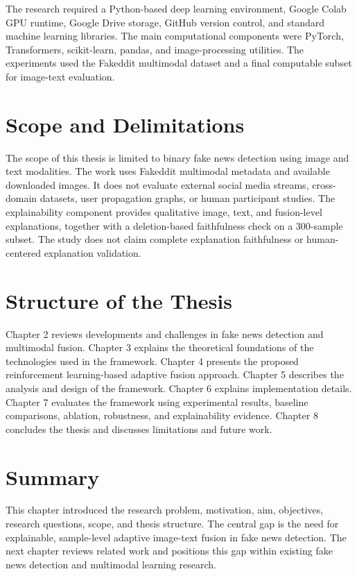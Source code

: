 The research required a Python-based deep learning environment, Google Colab GPU runtime, Google Drive storage, GitHub version control, and standard machine learning libraries. The main computational components were PyTorch, Transformers, scikit-learn, pandas, and image-processing utilities. The experiments used the Fakeddit multimodal dataset and a final computable subset for image-text evaluation.


\section{Scope and Delimitations}


The scope of this thesis is limited to binary fake news detection using image and text modalities. The work uses Fakeddit multimodal metadata and available downloaded images. It does not evaluate external social media streams, cross-domain datasets, user propagation graphs, or human participant studies. The explainability component provides qualitative image, text, and fusion-level explanations, together with a deletion-based faithfulness check on a 300-sample subset. The study does not claim complete explanation faithfulness or human-centered explanation validation.


\section{Structure of the Thesis}


Chapter 2 reviews developments and challenges in fake news detection and multimodal fusion. Chapter 3 explains the theoretical foundations of the technologies used in the framework. Chapter 4 presents the proposed reinforcement learning-based adaptive fusion approach. Chapter 5 describes the analysis and design of the framework. Chapter 6 explains implementation details. Chapter 7 evaluates the framework using experimental results, baseline comparisons, ablation, robustness, and explainability evidence. Chapter 8 concludes the thesis and discusses limitations and future work.


\section{Summary}


This chapter introduced the research problem, motivation, aim, objectives, research questions, scope, and thesis structure. The central gap is the need for explainable, sample-level adaptive image-text fusion in fake news detection. The next chapter reviews related work and positions this gap within existing fake news detection and multimodal learning research.

\clearpage
